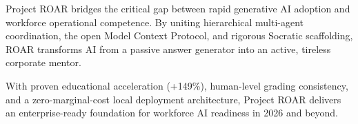 \documentclass[11pt,a4paper]{article}
\begin{document}
\vspace{-2pt}

\begin{summarybox}[title=Conclusion and Strategic Vision]
Project ROAR bridges the critical gap between rapid generative AI adoption and workforce operational competence. By uniting hierarchical multi-agent coordination, the open Model Context Protocol, and rigorous Socratic scaffolding, ROAR transforms AI from a passive answer generator into an active, tireless corporate mentor. 

With proven educational acceleration (+149\%), human-level grading consistency, and a zero-marginal-cost local deployment architecture, Project ROAR delivers an enterprise-ready foundation for workforce AI readiness in 2026 and beyond.
\end{summarybox}
\end{document}
